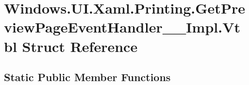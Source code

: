\hypertarget{struct_windows_1_1_u_i_1_1_xaml_1_1_printing_1_1_get_preview_page_event_handler_____impl_1_1_vtbl}{}\section{Windows.\+U\+I.\+Xaml.\+Printing.\+Get\+Preview\+Page\+Event\+Handler\+\_\+\+\_\+\+Impl.\+Vtbl Struct Reference}
\label{struct_windows_1_1_u_i_1_1_xaml_1_1_printing_1_1_get_preview_page_event_handler_____impl_1_1_vtbl}
\subsection*{Static Public Member Functions}

